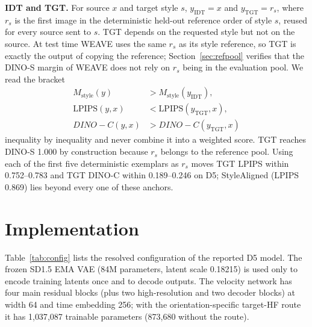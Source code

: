 \documentclass[conference]{IEEEtran}
\newcommand{\dinos}{DINO-S}
\newcommand{\dinoc}{DINO-C}
\begin{document}
\noindent\textbf{IDT and TGT.} For source $x$ and target style $s$, $y_{\mathrm{IDT}}=x$ and
$y_{\mathrm{TGT}}=r_s$, where $r_s$ is the first image in the deterministic held-out reference
order of style $s$, reused for every source sent to $s$. TGT depends on the requested style but
not on the source. At test time WEAVE uses the same $r_s$ as its style reference, so TGT is exactly
the output of copying the reference; Section~\ref{sec:refpool} verifies that the \dinos{} margin of
WEAVE does not rely on $r_s$ being in the evaluation pool. We read the bracket
\begin{equation}
\begin{aligned}
M_{\mathrm{style}}(y)&>M_{\mathrm{style}}(y_{\mathrm{IDT}}),\\
\mathrm{LPIPS}(y,x)&<\mathrm{LPIPS}(y_{\mathrm{TGT}},x),\\
\dinoc(y,x)&>\dinoc(y_{\mathrm{TGT}},x)
\end{aligned}
\end{equation}
inequality by inequality and never combine it into a weighted score. TGT reaches
\dinos{} 1.000 by construction because $r_s$ belongs to the reference pool. Using each of the
first five deterministic exemplars as $r_s$ moves TGT LPIPS within 0.752--0.783 and TGT \dinoc{}
within 0.189--0.246 on D5; StyleAligned (LPIPS 0.869) lies beyond every one of these anchors.

\section{Implementation}
\label{sec:impl}

Table~\ref{tab:config} lists the resolved configuration of the reported D5 model. The frozen SD1.5
EMA VAE (84M parameters, latent scale 0.18215) is used only to encode training latents once and
to decode outputs. The velocity network has four main residual blocks (plus two high-resolution
and two decoder blocks) at width 64 and time embedding 256; with the orientation-specific
target-HF route it has 1{,}037{,}087 trainable parameters (873{,}680 without the route).
\end{document}
